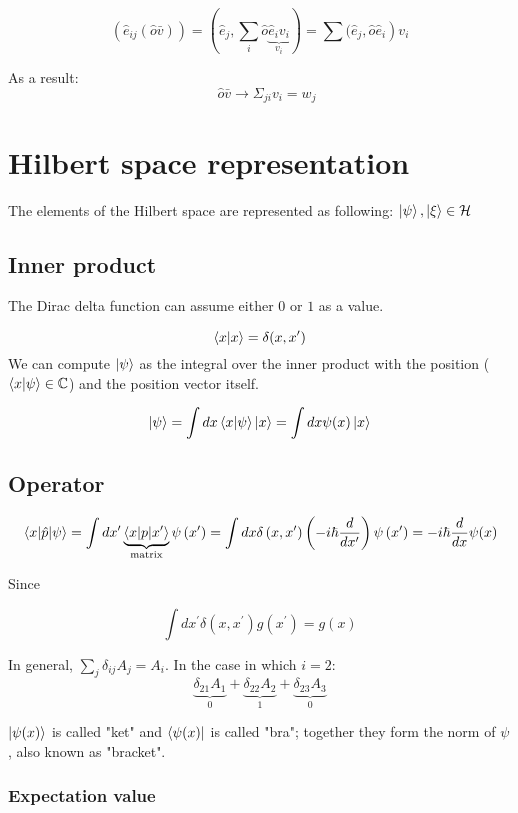     $$\left(\hat{e}_{i j}(\hat{o} \bar{v})\right)=(\hat{e}_{j}, \sum_{i} \hat{o} \underbrace{\hat{e}_{i} v_{i}}_{v_{i}})=\sum({\left.\hat{e}_{j}, \hat{o} \hat{e}_{i}\right) v_{i}}$$

    As a result: $$ \quad \hat{o} \bar{v} \rightarrow \Sigma_{j i} v_{i}=w_{j}$$

\section{Hilbert space representation}
The elements of the Hilbert space are represented as following: $\ket{\psi},\ket{\xi} \in \mathcal{H}$

    \subsection{Inner product}
    The Dirac delta function can assume either $0$ or $1$ as a value.

    $$\bra{x}\ket{x} = \delta (x,x')$$
    \noindent
    We can compute $\ket{\psi}$ as the integral over the inner product with the position ($\bra{x}\ket{\psi} \in \mathbb{C}$) and the position vector itself.

    $$\ket{\psi}= \int d x \bra{x}\ket{\psi} \ket{x} = \int d x \psi(x) \ket{x} $$

    \subsection{Operator}

    $$\mel{x}{\hat{p}}{\psi}=\int d x^{\prime} \underbrace{\left\langle x|p| x^{\prime}\right\rangle}_{\operatorname{matrix}} \psi\left(x^{\prime}\right)=\int d x \delta\left(x, x^{\prime}\right)\left(-i \hbar \frac{d}{d x^{\prime}}\right) \psi\left(x^{\prime}\right)=-i \hbar \frac{d}{d x} \psi(x)$$

    Since

    $$\int d x^{\prime} \delta\left(x, x^{\prime}\right) g\left(x^{\prime}\right)=g(x)$$

    In general, $\sum_{j} \delta_{i j} A_{j}=A_{i} $. In the case in which $i=2$:
    $$\underbrace{\delta_{21} A_{1}}_{0}+\underbrace{\delta_{22} A_{2}}_{1}+\underbrace{\delta_{23} A_{3}}_{0}$$

    \noindent
    $\ket{\psi(x)}$ is called "ket" and $\bra{\psi(x)}$ is called "bra"; together they form the norm of $\psi$,  also known as "bracket".

        \subsubsection{Expectation value}

